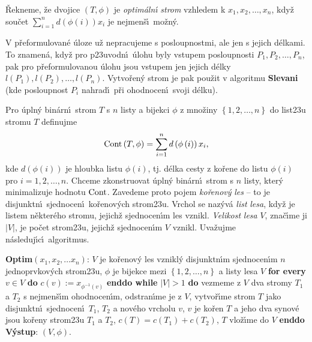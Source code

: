 \flushpar\v Rekneme, \v ze dvojice $\left(T,\phi \right)$ je \emph{optim\'aln\'\i} 
\emph{strom} vzhledem k $x_1,x_2,\dots,x_n$, kdy\v z  
sou\v cet $\sum_{i=1}^nd\left(\phi \left(i\right)\right)x_i$ je nejmen\v s\'\i\ mo\v zn\'y. 
\medskip

\flushpar V p\v reformulovan\'e \'uloze u\v z nepracujeme s 
posloupnostmi, ale jen s jejich d\'elkami. 
To znamen\'a, kdy\v z pro p\accent23uvodn\'\i\ \'ulohu 
byly vstupem posloupnosti $P_1,P_2,\dots,P_n$, pak pro 
p\v reformulovanou \'ulohu jsou vstupem jen jejich d\'elky  
$l\left(P_1\right),l\left(P_2\right),\dots,l\left(P_n\right)$. Vy\-tvo\v ren\'y strom je pak pou\-\v zit v algoritmu {\bf Slevani }
(kde posloupnost $P_i$ nahrad\'\i\ p\v ri ohodnocen\'\i\ svoji d\'elku).
\medskip

\flushpar Pro \'upln\'y bin\'arn\'\i\ strom $T$ s $n$ listy a bijekci $
\phi$ 
z mno\v ziny $\left\{1,2,\dots,n\right\}$ do list\accent23u stromu $T$ 
definujme 
$$\operatorname{Cont}\left(T,\phi \right)=\sum_{i=1}^nd\left(\phi \left(i\right)\right)x_i,$$
kde $d\left(\phi \left(i\right)\right)$ je hloubka listu $\phi \left(i\right)$, tj.  d\'elka cesty z 
ko\v rene do listu $\phi \left(i\right)$ pro $i=1,2,\dots,n$.  
Chceme zkonstruovat \'upln\'y bin\'arn\'\i\ strom s $n$ listy, 
kter\'y minimalizuje hodnotu $\operatorname{Cont}$. Zavedeme proto pojem 
\emph{ko\v renov\'y} \emph{les} -- to je disjunktn\'\i\ sjednocen\'\i\ 
ko\v re\-no\-v\'ych strom\accent23u. Vrchol se naz\'yv\'a \emph{list} 
\emph{lesa}, kdy\v z je listem n\v ekter\'eho stromu, jejich\v z 
sjednocen\'\i m les vznikl. \emph{Velikost} \emph{lesa} $V$, zna\v c\'\i me 
ji $|V|$, je po\v cet strom\accent23u, jejich\v z sjednocen\'\i m $
V$ vznikl.
Uva\v zujme n\'asleduj\'\i c\'\i\ algoritmus.  
\bigskip

{\bf Optim$\left(x_1,x_2,\dots x_n\right)$}:\newline 
$V$ je ko\v renov\'y les vznikl\'y disjunktn\'\i m sjednocen\'\i m $
n$ 
jednoprvkov\'ych strom\accent23u,\newline 
$\phi$ je bijekce mezi $\left\{1,2,\dots,n\right\}$ a listy lesa $V$\newline 
{\bf for every} $v\in V$ {\bf do} $c\left(v\right):=x_{\phi^{-1}\left(v\right)}$ {\bf enddo\newline 
while} $|V|>1$ {\bf do}\newline 
\phantom{---}vezmeme z $V$ dva stromy $T_1$ a $T_2$ s nejmen\v s\'\i m 
ohodnocen\'\i m, odstran\'\i me je z $V$,\newline 
\phantom{---}vytvo\v r\'\i me strom $T$ jako disjunktn\'\i\ sjednocen\'\i\  
$T_1$, $T_2$ a nov\'eho vrcholu $v$, \newline 
\phantom{---}$v$ je ko\v ren $T$ a jeho dva synov\'e jsou ko\v reny strom\accent23u $
T_1$ a 
$T_2$, \newline 
\phantom{---}$c\left(T\right)=c\left(T_1\right)+c\left(T_2\right)$, $T$ vlo\v z\'\i me do $V$\newline 
{\bf enddo\newline 
V\'ystup}: $\left(V,\phi \right)$.
\bigskip

